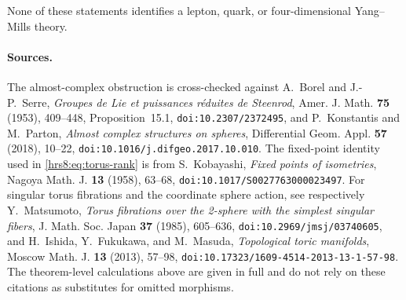 None of these statements identifies a lepton, quark, or four-dimensional
Yang--Mills theory.

\paragraph{Sources.}
The almost-complex obstruction is cross-checked against A.~Borel and
J.-P.~Serre, \emph{Groupes de Lie et puissances r\'eduites de Steenrod},
Amer. J. Math. \textbf{75} (1953), 409--448, Proposition~15.1,
\texttt{doi:10.2307/2372495}, and P.~Konstantis and M.~Parton,
\emph{Almost complex structures on spheres}, Differential Geom. Appl.
\textbf{57} (2018), 10--22,
\texttt{doi:10.1016/j.difgeo.2017.10.010}.  The fixed-point identity used in
\eqref{hrs8:eq:torus-rank} is from S.~Kobayashi, \emph{Fixed points of
isometries}, Nagoya Math. J. \textbf{13} (1958), 63--68,
\texttt{doi:10.1017/S0027763000023497}.  For singular torus fibrations and
the coordinate sphere action, see respectively Y.~Matsumoto, \emph{Torus
fibrations over the 2-sphere with the simplest singular fibers}, J. Math.
Soc. Japan \textbf{37} (1985), 605--636,
\texttt{doi:10.2969/jmsj/03740605}, and H.~Ishida, Y.~Fukukawa, and M.~Masuda,
\emph{Topological toric manifolds}, Moscow Math. J. \textbf{13} (2013),
57--98, \texttt{doi:10.17323/1609-4514-2013-13-1-57-98}.  The theorem-level
calculations above are given in full and do not rely on these citations as
substitutes for omitted morphisms.
